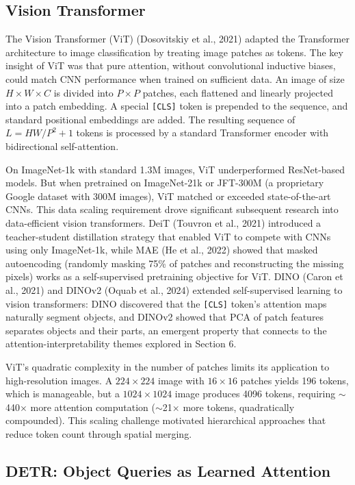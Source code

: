 \documentclass[10pt,twocolumn]{article}
\begin{document}
\subsection{Vision Transformer}\label{vision-transformer}

The Vision Transformer (ViT) (Dosovitskiy et al., 2021) adapted the Transformer architecture to image classification by treating image patches as tokens. The key insight of ViT was that pure attention, without convolutional inductive biases, could match CNN performance when trained on sufficient data. An image of size $H \times W \times C$ is divided into $P \times P$ patches, each flattened and linearly projected into a patch embedding. A special \texttt{[CLS]} token is prepended to the sequence, and standard positional embeddings are added. The resulting sequence of $L = HW/P^2 + 1$ tokens is processed by a standard Transformer encoder with bidirectional self-attention.

On ImageNet-1k with standard 1.3M images, ViT underperformed ResNet-based models. But when pretrained on ImageNet-21k or JFT-300M (a proprietary Google dataset with 300M images), ViT matched or exceeded state-of-the-art CNNs. This data scaling requirement drove significant subsequent research into data-efficient vision transformers. DeiT (Touvron et al., 2021) introduced a teacher-student distillation strategy that enabled ViT to compete with CNNs using only ImageNet-1k, while MAE (He et al., 2022) showed that masked autoencoding (randomly masking 75\% of patches and reconstructing the missing pixels) works as a self-supervised pretraining objective for ViT. DINO (Caron et al., 2021) and DINOv2 (Oquab et al., 2024) extended self-supervised learning to vision transformers: DINO discovered that the \texttt{[CLS]} token's attention maps naturally segment objects, and DINOv2 showed that PCA of patch features separates objects and their parts, an emergent property that connects to the attention-interpretability themes explored in Section 6.

ViT's quadratic complexity in the number of patches limits its application to high-resolution images. A $224 \times 224$ image with $16 \times 16$ patches yields 196 tokens, which is manageable, but a $1024 \times 1024$ image produces 4096 tokens, requiring $\sim$440$\times$ more attention computation ($\sim$21$\times$ more tokens, quadratically compounded). This scaling challenge motivated hierarchical approaches that reduce token count through spatial merging.

\subsection{DETR: Object Queries as Learned Attention}\label{detr-object-queries-as-learned-attention}
\end{document}
